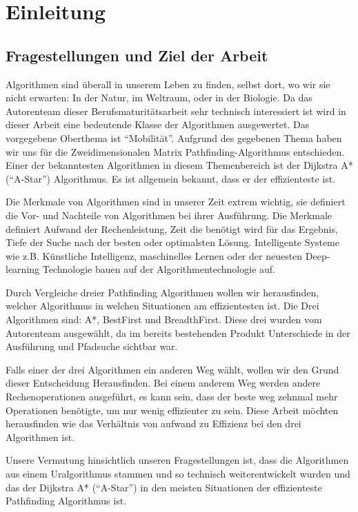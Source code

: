 \chapter{Einleitung}
\section{Fragestellungen und Ziel der Arbeit}
Algorithmen sind überall in unserem Leben zu finden, selbst dort, wo wir sie nicht erwarten: In der Natur, im Weltraum, oder in der Biologie. Da das Autorenteam dieser Berufsmaturitätsarbeit sehr technisch interessiert ist wird in dieser Arbeit eine bedeutende Klasse der Algorithmen ausgewertet. Das vorgegebene Oberthema ist ``Mobilität''. Aufgrund des gegebenen Thema haben wir uns für die Zweidimensionalen Matrix Pathfinding-Algorithmus entschieden. Einer der bekanntesten Algorithmen in diesem Themenbereich ist der Dijkstra A* (``A-Star'') Algorithmus. Es ist allgemein bekannt, dass er der effizienteste ist. 

Die Merkmale von Algorithmen sind in unserer Zeit extrem wichtig, sie definiert die Vor- und Nachteile von Algorithmen bei ihrer Ausführung. Die Merkmale definiert Aufwand der Rechenleistung, Zeit die benötigt wird für das Ergebnis, Tiefe der Suche nach der besten oder optimalsten Lösung. Intelligente Systeme wie z.B. Künstliche Intelligenz, maschinelles Lernen oder der neuesten Deep-learning Technologie bauen auf der Algorithmentechnologie auf.


Durch Vergleiche dreier Pathfinding Algorithmen wollen wir herausfinden, welcher Algorithmus in welchen Situationen am effizientesten ist. Die Drei Algorithmen sind: A*, BestFirst und BreadthFirst. Diese drei wurden vom Autorenteam ausgewählt, da im bereits bestehenden Produkt Unterschiede in der Ausführung und Pfadsuche sichtbar war.


Falls einer der drei Algorithmen ein anderen Weg wählt, wollen wir den Grund dieser Entscheidung Herausfinden. Bei einem anderem Weg werden andere Rechenoperationen ausgeführt, es kann sein, dass der beste weg zehnmal mehr Operationen benötigte, um nur wenig effizienter zu sein. Diese Arbeit möchten herausfinden wie das Verhältnis von aufwand zu Effizienz bei den drei Algorithmen ist.


Unsere Vermutung hinsichtlich unseren Fragestellungen ist, dass die Algorithmen aus einem Uralgorithmus stammen und so technisch weiterentwickelt wurden und das der Dijkstra A* (``A-Star'') in den meisten Situationen der effizienteste Pathfinding Algorithmus ist. \cite[Andrew Walker, StackOverflow, 2012]{isastarbest}

